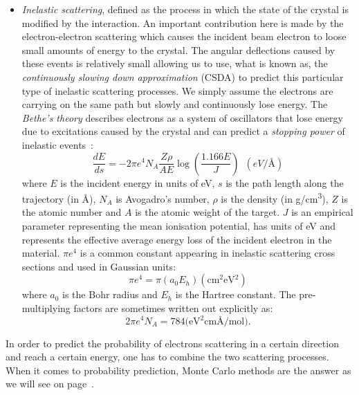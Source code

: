 \begin{itemize}
\item \textit{Inelastic scattering}, defined as the process in which the state of the crystal is modified by the interaction. An important contribution here is made by the electron-electron scattering which causes the incident beam electron to loose small amounts of energy to the crystal. The angular deflections caused by these events is relatively small allowing us to use, what is known as, the \textit{continuously slowing down approximation} (CSDA) to  predict this particular type of inelastic scattering processes. We simply assume the electrons are carrying on the same path but slowly and continuously lose energy. The \textit{Bethe's theory} describes electrons as a system of oscillators that lose energy due to excitations caused by the crystal and can predict a \textit{stopping power} of inelastic events~\cite{joy1989}:
\begin{equation}
    \frac{dE}{ds} = -2\pi e^4 N_A  \frac{Z \rho}{A E} \log{\left( \frac{1.166E}{J}\right)} \, \, \, (\si{eV/\angstrom})
\end{equation}
where $E$ is the incident energy in units of \si{\eV}, $s$ is the path length along the trajectory (in \si{\angstrom}), $N_A$ is Avogadro's number, $\rho$ is the density (in \si{\gram/\cm^3}), $Z$ is the atomic number and $A$ is the atomic weight of the target. $J$ is an empirical parameter representing the mean ionisation potential, has units of \si{\eV} and represents the effective average energy loss of the incident electron in the material. $\pi e^4$ is a common constant appearing in inelastic scattering cross sections and used in Gaussian units:
\begin{equation*}
\pi e^4 = \pi (a_0 E_h) (\si{\cm^2 \eV^2})
\end{equation*}
where $a_0$ is the Bohr radius and  $E_h$ is the Hartree constant. The pre-multiplying factors are sometimes written out explicitly as:
\begin{equation}
    2 \pi e^4 N_A = 784 (\si{\eV^2 \cm \angstrom/  \mol) }.
\end{equation}
\end{itemize}


In order to predict the probability of electrons scattering in a certain direction and reach a certain energy, one has to combine the two scattering processes. When it comes to probability prediction, Monte Carlo methods are the answer as we will see on page~\pageref{sec:MC}.





